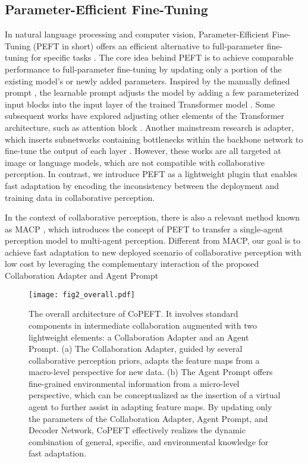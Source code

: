 \subsection{Parameter-Efficient Fine-Tuning}
In natural language processing and computer vision, Parameter-Efficient Fine-Tuning (PEFT in short) offers an efficient alternative to full-parameter fine-tuning for specific tasks \cite{xin2024parameter}. The core idea behind PEFT is to achieve comparable performance to full-parameter fine-tuning by updating only a portion of the existing model's or newly added parameters. Inspired by the manually defined prompt \cite{petroni2019language}, the learnable prompt adjusts the model by adding a few parameterized input blocks into the input layer of the trained Transformer model \cite{jia2022visual, dong2022lpt, nie2023pro}. Some subsequent works have explored adjusting other elements of the Transformer architecture, such as attention block \cite{li2021prefix}. Another mainstream research is adapter, which inserts subnetworks containing bottlenecks within the backbone network to fine-tune the output of each layer \cite{houlsby2019parameter, chen2022adaptformer, xin2024vmt}. However, these works are all targeted at image or language models, which are not compatible with collaborative perception. In contrast, we introduce PEFT as a lightweight plugin that enables fast adaptation by encoding the inconsistency between the deployment and training data in collaborative perception.

In the context of collaborative perception, there is also a relevant method known as MACP \cite{ma2024macp}, which introduces the concept of PEFT to transfer a single-agent perception model to multi-agent perception. Different  from MACP, our goal is to achieve fast adaptation to new deployed scenario of collaborative perception with low cost by leveraging the complementary interaction of the proposed Collaboration Adapter and Agent Prompt

\begin{figure*}[t]
\centering
\texttt{[image: fig2\_overall.pdf]} %
\caption{The overall architecture of CoPEFT. It involves standard components in intermediate collaboration augmented with two lightweight elements: a Collaboration Adapter and an Agent Prompt. (a) The Collaboration Adapter, guided by several collaborative perception priors, adapts the feature maps from a macro-level perspective for new data. (b) The Agent Prompt offers fine-grained environmental information from a micro-level perspective, which can be conceptualized as the insertion of a virtual agent to further assist in adapting feature maps. By updating only the parameters of the Collaboration Adapter, Agent Prompt, and Decoder Network, CoPEFT effectively realizes the dynamic combination of general, specific, and environmental knowledge for fast adaptation.}
\label{fig:overall_framework}
\end{figure*}